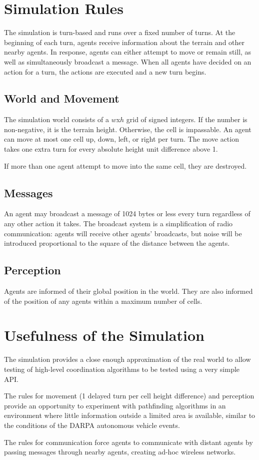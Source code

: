 \section{Simulation Rules}
\label{rules}

The simulation is turn-based and runs over a fixed number of turns. At the beginning of each turn, agents receive information about the terrain and other nearby agents. In response, agents can either attempt to move or remain still, as well as simultaneously broadcast a message. When all agents have decided on an action for a turn, the actions are executed and a new turn begins.

\subsection{World and Movement}

The simulation world consists of a $w$x$h$ grid of signed integers. If the number is non-negative, it is the terrain height. Otherwise, the cell is impassable. An agent can move at most one cell up, down, left, or right per turn. The move action takes one extra turn for every absolute height unit difference above 1.

If more than one agent attempt to move into the same cell, they are destroyed.

\subsection{Messages}

An agent may broadcast a message of 1024 bytes or less every turn regardless of any other action it takes. The broadcast system is a simplification of radio communication: agents will receive other agents' broadcasts, but noise will be introduced proportional to the square of the distance between the agents.

\subsection{Perception}

Agents are informed of their global position in the world. They are also informed of the position of any agents within a maximum number of cells.

\section{Usefulness of the Simulation}

The simulation provides a close enough approximation of the real world to allow testing of high-level coordination algorithms to be tested using a very simple API.

The rules for movement (1 delayed turn per cell height difference) and perception provide an opportunity to experiment with pathfinding algorithms in an environment where little information outside a limited area is available, similar to the conditions of the DARPA autonomous vehicle events.

The rules for communication force agents to communicate with distant agents by passing messages through nearby agents, creating ad-hoc wireless networks.
